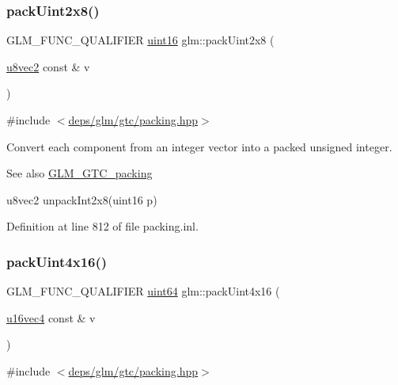 \subsubsection{\texorpdfstring{pack\+Uint2x8()}{packUint2x8()}}
{\footnotesize\ttfamily G\+L\+M\+\_\+\+F\+U\+N\+C\+\_\+\+Q\+U\+A\+L\+I\+F\+I\+ER \hyperlink{group__gtc__type__precision_gad8c2939e1fdd8e5828b31d95c52255d5}{uint16} glm\+::pack\+Uint2x8 (\begin{DoxyParamCaption}\item[{\hyperlink{group__gtc__type__precision_ga01e28d0272428f94d22ea6111f0112be}{u8vec2} const \&}]{v }\end{DoxyParamCaption})}



{\ttfamily \#include $<$\hyperlink{gtc_2packing_8hpp}{deps/glm/gtc/packing.\+hpp}$>$}

Convert each component from an integer vector into a packed unsigned integer.

\begin{DoxySeeAlso}{See also}
\hyperlink{group__gtc__packing}{G\+L\+M\+\_\+\+G\+T\+C\+\_\+packing} 

u8vec2 unpack\+Int2x8(uint16 p) 
\end{DoxySeeAlso}


Definition at line 812 of file packing.\+inl.

\mbox{\label{group__gtc__packing_ga19813cb34dd7102f9612ba6c0d9ef377}} 
\subsubsection{\texorpdfstring{pack\+Uint4x16()}{packUint4x16()}}
{\footnotesize\ttfamily G\+L\+M\+\_\+\+F\+U\+N\+C\+\_\+\+Q\+U\+A\+L\+I\+F\+I\+ER \hyperlink{group__gtc__type__precision_gae3632bf9b37da66233d78930dd06378a}{uint64} glm\+::pack\+Uint4x16 (\begin{DoxyParamCaption}\item[{\hyperlink{group__gtc__type__precision_ga049d45ad8d0f78578d7ceb86a7fdaae4}{u16vec4} const \&}]{v }\end{DoxyParamCaption})}



{\ttfamily \#include $<$\hyperlink{gtc_2packing_8hpp}{deps/glm/gtc/packing.\+hpp}$>$}

